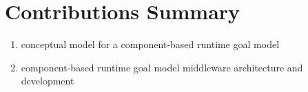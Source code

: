 
\section{Contributions Summary}

\begin{enumerate}
\item conceptual model for a component-based runtime goal model
\item component-based runtime goal model middleware architecture and development



\end{enumerate}
